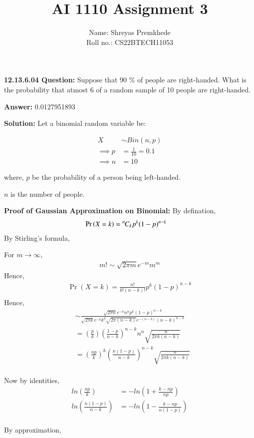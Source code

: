 \documentclass[journal,12pt,twocolumn]{IEEEtran}
\title{AI 1110 Assignment 3}
\providecommand{\pr}[1]{\ensuremath{\Pr\left(#1\right)}}
\theoremstyle{remark}
\newcommand{\permcomb}[4][0mu]{{{}^{#3}\mkern#1#2_{#4}}}
\newcommand{\comb}[1][-1mu]{\permcomb[#1]{C}}
\begin{document}
\author{Name: Shreyas Premkhede\\Roll no.: CS22BTECH11053}
\maketitle

\textbf{12.13.6.04 Question:} Suppose that 90 \% of people are right-handed. What is the probability that atmost 6 of a random sample of 10 people are right-handed. 


\textbf{Answer:}  0.0127951893


\textbf{Solution: } 
Let a binomial random variable be:

\begin{align} 
X &\sim Bin(n,p)\\
\implies p &= \frac{1}{10} = 0.1\\ 
\implies n &= 10
\end{align}	   

where, $p$ be the probability of a person being left-handed.

$n$ is the number of people.

\textbf{Proof of Gaussian Approximation on Binomial:}
By defination,
\begin{align}
\pr{X = k} &= \comb{n}{k} p^k (1-p)^{n-k}  
\end{align}
By Stirling's formula,

For \( m \to \infty\),
\begin{align}
m! \sim \sqrt{2\pi m}e^{-m}m^m
\end{align}
Hence,
\begin{align}
\pr{X = k} = \frac{n!}{k!(n-k)!} p^k (1-p)^{n-k}\\
\end{align}
Hence,
\begin{align}
&\sim \frac{\sqrt{2\pi n}e^{-n}n^n p^k (1-p)^{n-k}}{\sqrt{2\pi k}e^{-k}k^k \sqrt{2\pi (n-k)}e^{-(n-k)}(n-k)^{n-k}}\\
&= \left(\frac{p}{k}\right)\left(\frac{1-p}{n-k}\right)^{n-k}n^n \sqrt{\frac{n}{2\pi k (n-k)}}\\
&= \left(\frac{np}{k}\right)^{k}\left(\frac{n(1-p)}{n-k}\right)^{n-k}\sqrt{\frac{n}{2\pi k (n-k)}}
\end{align}
\\
Now by identities,
\begin{align}
ln\left(\frac{np}{k}\right)&= -ln\left(1 + \frac{k-np}{np}\right)\\
ln\left(\frac{n(1-p)}{n-k}\right)&= -ln\left(1 - \frac{k-np}{n(1-p)}\right)
\end{align}
\\
By approximation,
\end{document}
